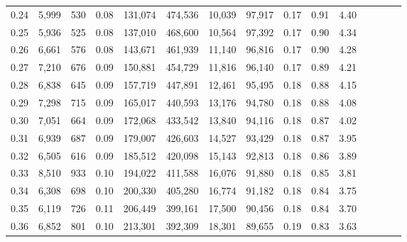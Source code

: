 \begin{tabular}{rrrcrrrrrrrrrrr}
0.24 &   5,999 &    530 &                                       0.08 &  131,074 &  474,536 &   10,039 &   97,917 &  0.17 &  0.91 &                         4.40 \\
0.25 &   5,936 &    525 &                                       0.08 &  137,010 &  468,600 &   10,564 &   97,392 &  0.17 &  0.90 &                         4.34 \\
0.26 &   6,661 &    576 &                                       0.08 &  143,671 &  461,939 &   11,140 &   96,816 &  0.17 &  0.90 &                         4.28 \\
0.27 &   7,210 &    676 &                                       0.09 &  150,881 &  454,729 &   11,816 &   96,140 &  0.17 &  0.89 &                         4.21 \\
0.28 &   6,838 &    645 &                                       0.09 &  157,719 &  447,891 &   12,461 &   95,495 &  0.18 &  0.88 &                         4.15 \\
0.29 &   7,298 &    715 &                                       0.09 &  165,017 &  440,593 &   13,176 &   94,780 &  0.18 &  0.88 &                         4.08 \\
0.30 &   7,051 &    664 &                                       0.09 &  172,068 &  433,542 &   13,840 &   94,116 &  0.18 &  0.87 &                         4.02 \\
0.31 &   6,939 &    687 &                                       0.09 &  179,007 &  426,603 &   14,527 &   93,429 &  0.18 &  0.87 &                         3.95 \\
0.32 &   6,505 &    616 &                                       0.09 &  185,512 &  420,098 &   15,143 &   92,813 &  0.18 &  0.86 &                         3.89 \\
0.33 &   8,510 &    933 &                                       0.10 &  194,022 &  411,588 &   16,076 &   91,880 &  0.18 &  0.85 &                         3.81 \\
0.34 &   6,308 &    698 &                                       0.10 &  200,330 &  405,280 &   16,774 &   91,182 &  0.18 &  0.84 &                         3.75 \\
0.35 &   6,119 &    726 &                                       0.11 &  206,449 &  399,161 &   17,500 &   90,456 &  0.18 &  0.84 &                         3.70 \\
0.36 &   6,852 &    801 &                                       0.10 &  213,301 &  392,309 &   18,301 &   89,655 &  0.19 &  0.83 &                         3.63 \\

\end{tabular}
